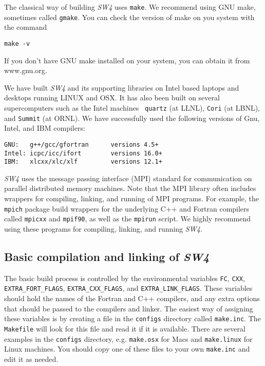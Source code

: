 \documentclass[11pt]{article}
\begin{document}
The classical way of building \emph{SW4} uses \verb+make+. We recommend using GNU make, sometimes called \verb+gmake+. You can check the version of make on you system with the command
\begin{verbatim}
make -v
\end{verbatim}
If you don't have GNU make installed on your system, you can obtain it from www.gnu.org.

We have built \emph{SW4} and its supporting libraries on Intel based laptops and desktops running
LINUX and OSX. It has also been built on several supercomputers such as the Intel machines {\tt 
quartz} (at LLNL), {\tt Cori} (at LBNL), and {\tt Summit} (at ORNL). We have
successfully used the following versions of Gnu, Intel, and IBM compilers:
\begin{verbatim}
GNU:   g++/gcc/gfortran      versions 4.5+
Intel: icpc/icc/ifort        versions 16.0+
IBM:   xlcxx/xlc/xlf         versions 12.1+
\end{verbatim}

\emph{SW4} uses the message passing interface (MPI) standard for communication on parallel distributed memory machines. Note that the MPI library often includes wrappers for compiling, linking, and running of MPI programs. For example, the {\tt mpich} package build wrappers for the underlying C++ and Fortran compilers called {\tt mpicxx} and {\tt mpif90}, as well as the {\tt mpirun} script. We highly recommend using these programs for compiling, linking, and running \emph{SW4}.


\subsection{Basic compilation and linking of \emph{SW4}}\label{sec:basic-install}

The basic build process is controlled by the environmental variables \verb+FC+, \verb+CXX+, \verb+EXTRA_FORT_FLAGS+, \verb+EXTRA_CXX_FLAGS+, and \verb+EXTRA_LINK_FLAGS+. These variables should hold the names of the Fortran and C++ compilers, and any extra options that should be passed to the compilers and linker. The easiest way of assigning these variables is by creating a file in the \verb+configs+ directory called \verb+make.inc+. The \verb+Makefile+ will look for this file and read it if it is available. There are several examples in the \verb+configs+ directory, e.g. \verb+make.osx+ for Macs and \verb+make.linux+ for Linux machines. You should copy one of these files to your own \verb+make.inc+ and edit it as needed. 
\end{document}
